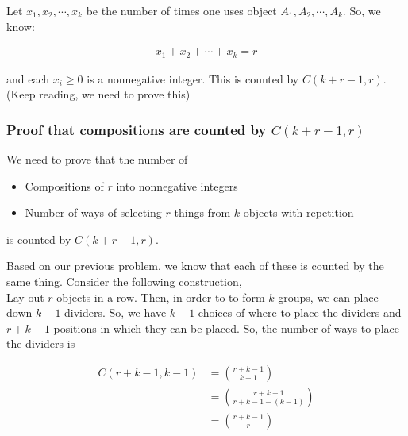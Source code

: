 \documentclass{report}
\begin{document}

\begin{subproof}
    Let $x_1, x_2, \cdots, x_k$ be the number of times one uses object 
    $A_1, A_2, \cdots, A_k$. So, we know: 

    \begin{align*}
        x_1 + x_2 + \cdots + x_k = r
    \end{align*}

    \noindent
    and each $x_i \ge 0$ is a nonnegative integer.
    This is counted by $C(k+r-1,r)$. (Keep reading, we need to prove this)
\end{subproof}

\subsubsection*{Proof that compositions are counted by $C(k+r-1,r)$}

We need to prove that the number of 

\begin{itemize}
    \item Compositions of $r$ into nonnegative integers
    \item Number of ways of selecting $r$ things from $k$ objects with repetition
\end{itemize}

\noindent
is counted by $C(k+r-1,r)$.

\begin{subproof}
    Based on our previous problem, we know that each of these is counted 
    by the same thing. Consider the following construction, \\

    Lay out $r$ objects in a row. Then, in order to to form $k$ groups, 
    we can place down $k-1$ dividers. So, we have $k-1$ choices of where 
    to place the dividers and $r+k-1$ positions in which they can be placed.
    So, the number of ways to place the dividers is 

    \begin{align*}
        C(r+k-1,k-1) &= \binom{r+k-1}{k-1} \\
        &= \binom{r+k-1}{r+k-1-(k-1)} \\ 
        &= \binom{r+k-1}{r}
    \end{align*}
\end{subproof}
\end{document}
